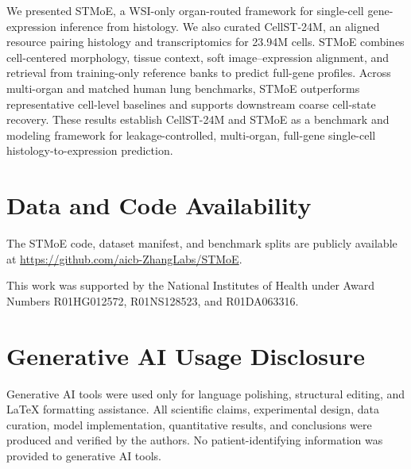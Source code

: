 \documentclass[sigconf]{acmart}
\newcommand{\method}{STMoE\xspace}
\begin{document}
We presented \method{}, a WSI-only organ-routed framework for single-cell gene-expression inference from histology. We also curated CellST-24M, an aligned resource pairing histology and transcriptomics for 23.94M cells. \method{} combines cell-centered morphology, tissue context, soft image--expression alignment, and retrieval from training-only reference banks to predict full-gene profiles. Across multi-organ and matched human lung benchmarks, \method{} outperforms representative cell-level baselines and supports downstream coarse cell-state recovery. These results establish CellST-24M and \method{} as a benchmark and modeling framework for leakage-controlled, multi-organ, full-gene single-cell histology-to-expression prediction.


\section{Data and Code Availability}

The STMoE code, dataset manifest, and benchmark splits are publicly available at
\url{https://github.com/aicb-ZhangLabs/STMoE}.



\begin{acks}
This work was supported by the National Institutes of Health under Award Numbers R01HG012572, R01NS128523, and R01DA063316.
\end{acks}



\section*{Generative AI Usage Disclosure}

Generative AI tools were used only for language polishing, structural editing, and LaTeX formatting assistance. All scientific claims, experimental design, data curation, model implementation, quantitative results, and conclusions were produced and verified by the authors. No patient-identifying information was provided to generative AI tools.



\end{document}
